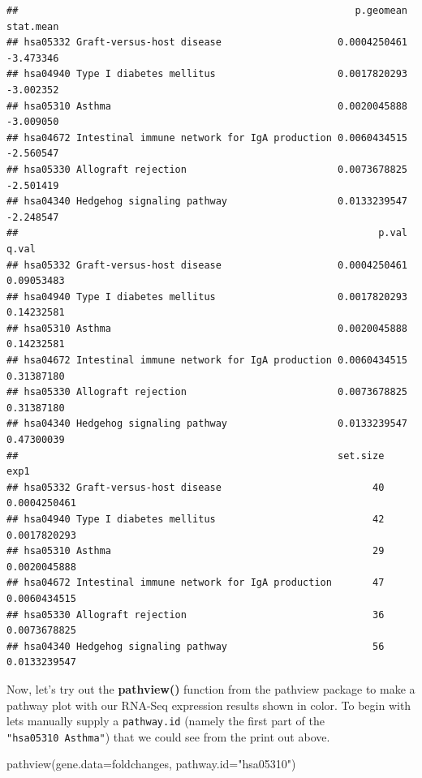 \documentclass[
]{article}
\newenvironment{Shaded}{\begin{snugshade}}{\end{snugshade}}
\newcommand{\AttributeTok}[1]{\textcolor[rgb]{0.77,0.63,0.00}{#1}}
\newcommand{\FunctionTok}[1]{\textcolor[rgb]{0.00,0.00,0.00}{#1}}
\newcommand{\NormalTok}[1]{#1}
\newcommand{\StringTok}[1]{\textcolor[rgb]{0.31,0.60,0.02}{#1}}
\begin{document}
\begin{verbatim}
##                                                          p.geomean stat.mean
## hsa05332 Graft-versus-host disease                    0.0004250461 -3.473346
## hsa04940 Type I diabetes mellitus                     0.0017820293 -3.002352
## hsa05310 Asthma                                       0.0020045888 -3.009050
## hsa04672 Intestinal immune network for IgA production 0.0060434515 -2.560547
## hsa05330 Allograft rejection                          0.0073678825 -2.501419
## hsa04340 Hedgehog signaling pathway                   0.0133239547 -2.248547
##                                                              p.val      q.val
## hsa05332 Graft-versus-host disease                    0.0004250461 0.09053483
## hsa04940 Type I diabetes mellitus                     0.0017820293 0.14232581
## hsa05310 Asthma                                       0.0020045888 0.14232581
## hsa04672 Intestinal immune network for IgA production 0.0060434515 0.31387180
## hsa05330 Allograft rejection                          0.0073678825 0.31387180
## hsa04340 Hedgehog signaling pathway                   0.0133239547 0.47300039
##                                                       set.size         exp1
## hsa05332 Graft-versus-host disease                          40 0.0004250461
## hsa04940 Type I diabetes mellitus                           42 0.0017820293
## hsa05310 Asthma                                             29 0.0020045888
## hsa04672 Intestinal immune network for IgA production       47 0.0060434515
## hsa05330 Allograft rejection                                36 0.0073678825
## hsa04340 Hedgehog signaling pathway                         56 0.0133239547
\end{verbatim}

Now, let's try out the \textbf{pathview()} function from the pathview
package to make a pathway plot with our RNA-Seq expression results shown
in color. To begin with lets manually supply a \texttt{pathway.id}
(namely the first part of the \texttt{"hsa05310\ Asthma"}) that we could
see from the print out above.

\begin{Shaded}
\begin{Highlighting}[]
\FunctionTok{pathview}\NormalTok{(}\AttributeTok{gene.data=}\NormalTok{foldchanges, }\AttributeTok{pathway.id=}\StringTok{"hsa05310"}\NormalTok{)}
\end{Highlighting}
\end{Shaded}
\end{document}
